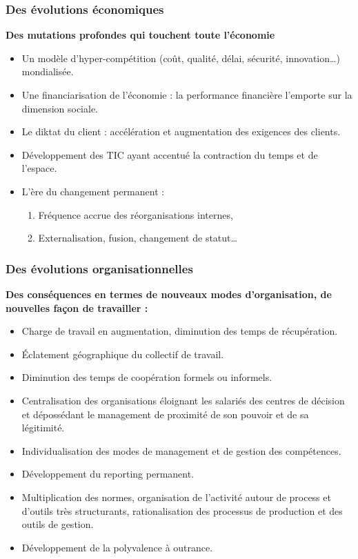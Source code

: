 \documentclass{beamer}
\begin{document}
\begin{frame}
\frametitle{Des évolutions économiques}
\textbf{Des mutations profondes qui touchent toute l’économie}  
\begin{itemize}
\item Un modèle d’hyper-compétition (coût, qualité, délai, sécurité, innovation…) mondialisée.
\item Une financiarisation de l’économie : la performance financière l’emporte sur la dimension sociale.
\item Le diktat du client : accélération et augmentation des exigences des clients.
\item Développement des TIC ayant accentué la contraction du temps et de l’espace.
\item L’ère du changement permanent :
\begin{enumerate}
\item Fréquence accrue des réorganisations internes,
\item Externalisation, fusion, changement de statut… 
\end{enumerate}
\end{itemize}
\end{frame} 

\begin{frame}
\frametitle{Des évolutions organisationnelles}
\textbf{Des conséquences en termes de nouveaux modes d’organisation, de nouvelles façon de travailler :}  
\begin{itemize}
\item Charge de travail en augmentation, diminution des temps de récupération.
\item Éclatement géographique du collectif de travail.
\item Diminution des temps de coopération formels ou informels.
\item Centralisation des organisations éloignant les salariés des centres de décision et  dépossédant le management de proximité de son pouvoir et de sa légitimité.
\item Individualisation des modes de management et de gestion des compétences.
\item Développement du reporting permanent.
\item Multiplication des normes, organisation de l’activité autour de process et d’outils très structurants, 
rationalisation des processus de production et des outils de gestion.
\item Développement de la polyvalence à outrance.
\end{itemize}
\end{frame} 
\end{document}
